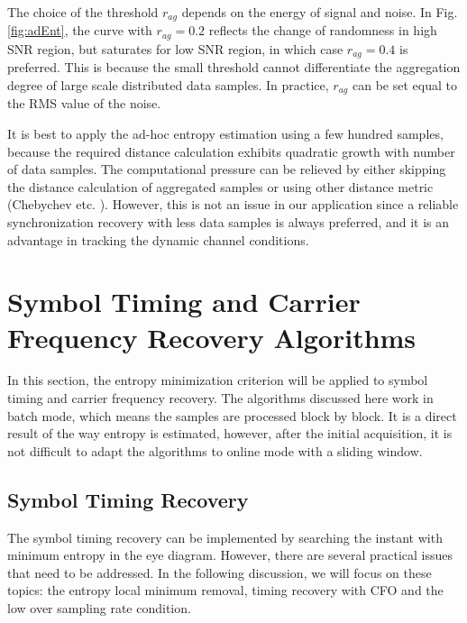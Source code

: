 \documentclass[journal,comsoc]{IEEEtran}
\begin{document}
The choice of the threshold \(r_{ag}\) depends on the energy of signal and noise.
In Fig. \ref{fig:adEnt}, the curve with \(r_{ag}=0.2\) reflects the change of randomness in high SNR region, but saturates for low SNR region, in which case \(r_{ag}=0.4\) is preferred.
This is because the small threshold cannot differentiate the aggregation degree of large scale distributed data samples.
In practice, $r_{ag}$ can be set equal to the RMS value of the noise.

It is best to apply the ad-hoc entropy estimation using a few hundred samples,
because the required distance calculation exhibits quadratic growth with number of data samples. 
The computational pressure can be relieved by either skipping the distance calculation of aggregated samples or using other distance metric (Chebychev etc. \cite{Cha2007ComprehensiveFunctions}).
However, this is not an issue in our application since a reliable synchronization  recovery with less data samples is always preferred, and it is an advantage in tracking the dynamic channel conditions. 
\section{Symbol Timing and Carrier Frequency Recovery Algorithms}
\label{sec:sync_algo}
In this section, the entropy minimization criterion will be applied to symbol timing and carrier frequency recovery.
The algorithms discussed here work in batch mode, which means the samples are processed block by block. 
It is a direct result of the way entropy is estimated, however, after the initial acquisition, it is not difficult to adapt the algorithms to online mode with a sliding window.





\subsection{Symbol Timing Recovery} 
\label{sec:timing}
The symbol timing recovery can be implemented by searching the instant with minimum entropy in the eye diagram.
However, there are several practical issues that need to be addressed.
In the following discussion, we will focus on these topics: the entropy local minimum removal, timing recovery with CFO and the low over sampling rate condition.
\end{document}
